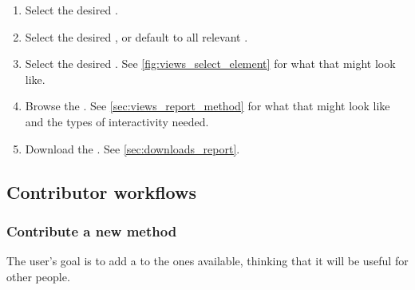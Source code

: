 \begin{enumerate}
    \item Select the desired \Method.
    \item Select the desired \Task, or default to all relevant \Tasks.
    \item Select the desired \Elements.
          See \cref{fig:views_select_element} for what that might look like.
    \item Browse the \Report.
          See \cref{sec:views_report_method} for what that might look like and the types of interactivity needed.
    \item Download the \Report.
          See \cref{sec:downloads_report}.
\end{enumerate}

\subsection{Contributor workflows}
\label{sec:workflows_contrib}

\subsubsection{Contribute a new method}

The user's goal is to add a \Method to the ones available, thinking that it will be useful for other people.

